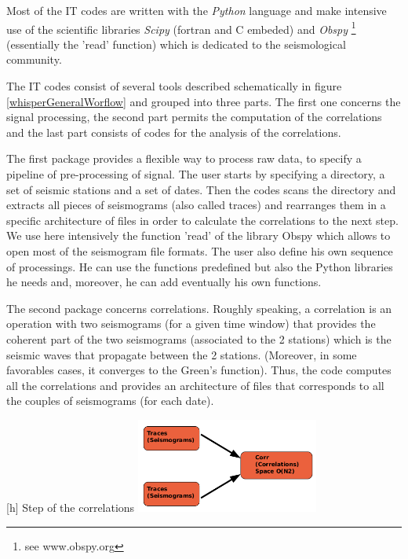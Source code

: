 \documentclass[a4paper, 10pt]{article}
\begin{document}
\begin{multicols}{2}
Most of the IT codes are written with the \emph{Python} language and make intensive use of the scientific libraries \emph{Scipy} (fortran and C embeded) 
and \emph{Obspy} \footnote{ see www.obspy.org} (essentially the 'read' function) which is dedicated to the seismological community. 

The IT codes consist of several tools described schematically in figure \ref{whisperGeneralWorflow} and grouped into three parts. The first one concerns the signal processing, the second part permits the computation of the correlations and the last part consists of codes for the analysis of the correlations.

The first package provides a flexible way to process raw data, to specify a pipeline of pre-processing of signal.
The user starts by specifying a directory, a set of seismic stations and a set of dates. Then the codes scans the directory
and extracts all pieces of seismograms (also called traces) and rearranges them in a specific architecture of files in order to calculate the correlations to the next step.
We use here intensively the function 'read' of the library Obspy which allows to open most of the seismogram file formats.
The user also define his own sequence of processings. He can use the functions predefined but also the Python libraries he needs and,
moreover, he can add eventually his own functions.

The second package concerns correlations. 
Roughly speaking, a correlation is an operation with two seismograms (for a given time window) that provides the coherent part of the two seismograms 
(associated to the 2 stations) which is the seismic waves that propagate between the 2 stations.
(Moreover, in some favorables cases, it converges to the Green's function). 
Thus, the code computes all the correlations and provides an architecture of files that corresponds to all the couples of seismograms (for each date). 

\begin{center}
\centering
{}[h]{\label{whisperCorrelationStep} Step of the correlations}
\includegraphics[width=6cm]{schemaCorrelationStep.png}
\end{center}


\end{multicols}
\end{document}
